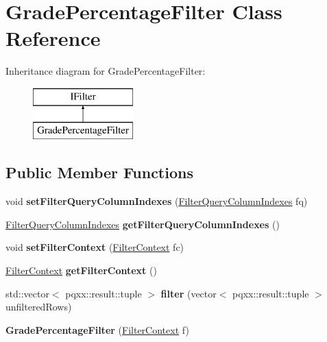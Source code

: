 \hypertarget{classGradePercentageFilter}{}\section{Grade\+Percentage\+Filter Class Reference}
\label{classGradePercentageFilter}
Inheritance diagram for Grade\+Percentage\+Filter\+:\begin{figure}[H]
\begin{center}
\leavevmode
\includegraphics[height=2.000000cm]{classGradePercentageFilter}
\end{center}
\end{figure}
\subsection*{Public Member Functions}
\begin{DoxyCompactItemize}
\item 
\mbox{\label{classGradePercentageFilter_ac7a84e4ac69a5a8b34dab99a607bd2c6}} 
void {\bfseries set\+Filter\+Query\+Column\+Indexes} (\hyperlink{structFilterQueryColumnIndexes}{Filter\+Query\+Column\+Indexes} fq)
\item 
\mbox{\label{classGradePercentageFilter_a742c141c49cfdfbbaa24bf591e7e5372}} 
\hyperlink{structFilterQueryColumnIndexes}{Filter\+Query\+Column\+Indexes} {\bfseries get\+Filter\+Query\+Column\+Indexes} ()
\item 
\mbox{\label{classGradePercentageFilter_a2037adfc91055fdf4f325bfe9e32c679}} 
void {\bfseries set\+Filter\+Context} (\hyperlink{structFilterContext}{Filter\+Context} fc)
\item 
\mbox{\label{classGradePercentageFilter_ad21749352c3b56e1675535e008ff5c00}} 
\hyperlink{structFilterContext}{Filter\+Context} {\bfseries get\+Filter\+Context} ()
\item 
\mbox{\label{classGradePercentageFilter_ab89b43a19f6bdc7f15421cd4b8747ad2}} 
std\+::vector$<$ pqxx\+::result\+::tuple $>$ {\bfseries filter} (vector$<$ pqxx\+::result\+::tuple $>$ unfiltered\+Rows)
\item 
\mbox{\label{classGradePercentageFilter_adc5a15db768c64778c59ff651b19aa29}} 
{\bfseries Grade\+Percentage\+Filter} (\hyperlink{structFilterContext}{Filter\+Context} f)
\end{DoxyCompactItemize}
